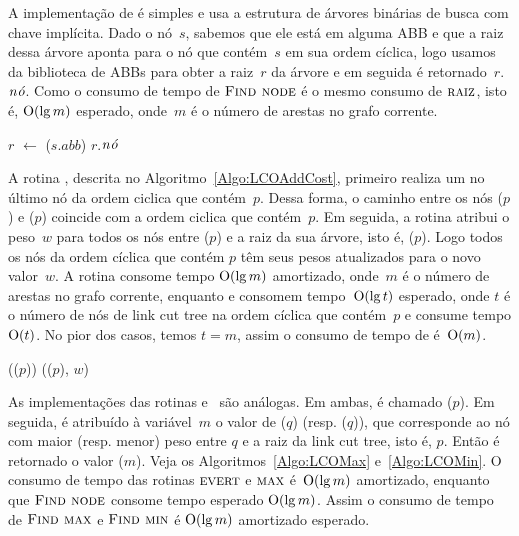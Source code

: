 A implementação de \LCOFindNode{} é simples e usa a estrutura de árvores binárias de busca com chave implícita.
Dado o nó~$s$, sabemos que ele está em alguma ABB e que a raiz dessa árvore aponta para o nó que contém~$s$ em sua ordem cíclica,
logo usamos \treapGetRoot{} da biblioteca de ABBs para obter a raiz~$r$ da árvore e em seguida é retornado~$r$.$\mathit{n\acute{o}}$.
Como o consumo de tempo de $\text{\scshape Find node}$ é o mesmo consumo de $\text{\scshape raiz}$, isto é, $\mathrm{O}(\lg m)$ esperado, onde~$m$ é o número de arestas no grafo corrente.

\begin{algorithm}[htb]
\caption{\LCOFindNode($s$)}
\label{Algo:LCOFindNode}
\begin{algorithmic}[1]
\State $r$ $\gets$ \treapGetRoot($s.abb$)
\State \Return $r$.$\mathit{n\acute{o}}$
\end{algorithmic}
\end{algorithm}

A rotina \LCOAddCost{}, descrita no Algoritmo~\ref{Algo:LCOAddCost}, primeiro realiza um \linkcutEvert{} no último nó da ordem ciclica que contém~$p$.
Dessa forma, o caminho entre os nós \treapFirst($p$) e \treapLast($p$) coincide com a ordem ciclica que contém~$p$.
Em seguida, a rotina \linkcutWeight{} atribui o peso~$w$ para todos os nós entre \treapFirst($p$) e a raiz da sua árvore, isto é, \treapLast($p$).
Logo todos os nós da ordem cíclica que contém $p$ têm seus pesos atualizados para o novo valor~$w$.
A rotina \linkcutEvert{} consome tempo $\mathrm{O}(\lg m)$ amortizado, onde~$m$ é o número de arestas no grafo corrente, enquanto \treapLast{} e \treapFirst{} consomem tempo~$\mathrm{O}(\lg t)$ esperado, onde $t$ é o número de nós de link cut tree na ordem cíclica que contém~$p$ e \linkcutWeight{} consume tempo $\mathrm{O}(t)$.
No pior dos casos, temos $t=m$, assim o consumo de tempo de \LCOAddCost{} é~$\mathrm{O}(m)$.

\begin{algorithm}[htb]
\caption{\LCOAddCost($p$, $w$)}
\label{Algo:LCOAddCost}
\begin{algorithmic}[1]
\State \linkcutEvert(\treapLast($p$))
\State \linkcutWeight(\treapFirst($p$), $w$)
\end{algorithmic}
\end{algorithm}

As implementações das rotinas \LCOMax{} e~\LCOMin{} são análogas.
Em ambas, é chamado \linkcutEvert($p$).
Em seguida, é atribuído à variável~$m$ o valor de \linkcutMax($q$) (resp. \linkcutMin($q$)), que corresponde ao nó com maior (resp. menor) peso entre $q$ e a raiz da link cut tree, isto é, $p$.
Então é retornado o valor \LCOFindNode($m$).
Veja os Algoritmos~\ref{Algo:LCOMax} e~\ref{Algo:LCOMin}.
O consumo de tempo das rotinas $\text{\scshape \text{\scshape evert}}$ e $\text{\scshape \text{\scshape max}}$ é~$\mathrm{O}(\lg m)$ amortizado, enquanto que $\text{\scshape Find node}$ consome tempo esperado $\mathrm{O}(\lg m)$. Assim o consumo de tempo de $\text{\scshape \text{\scshape Find max}}$ e $\text{\scshape \text{\scshape Find min}}$ é $\mathrm{O}(\lg m)$ amortizado esperado.


